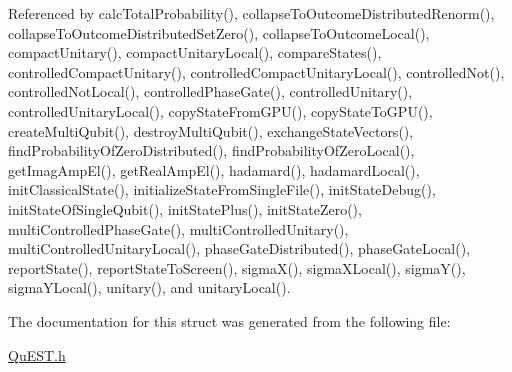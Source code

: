 Referenced by calc\+Total\+Probability(), collapse\+To\+Outcome\+Distributed\+Renorm(), collapse\+To\+Outcome\+Distributed\+Set\+Zero(), collapse\+To\+Outcome\+Local(), compact\+Unitary(), compact\+Unitary\+Local(), compare\+States(), controlled\+Compact\+Unitary(), controlled\+Compact\+Unitary\+Local(), controlled\+Not(), controlled\+Not\+Local(), controlled\+Phase\+Gate(), controlled\+Unitary(), controlled\+Unitary\+Local(), copy\+State\+From\+G\+P\+U(), copy\+State\+To\+G\+P\+U(), create\+Multi\+Qubit(), destroy\+Multi\+Qubit(), exchange\+State\+Vectors(), find\+Probability\+Of\+Zero\+Distributed(), find\+Probability\+Of\+Zero\+Local(), get\+Imag\+Amp\+El(), get\+Real\+Amp\+El(), hadamard(), hadamard\+Local(), init\+Classical\+State(), initialize\+State\+From\+Single\+File(), init\+State\+Debug(), init\+State\+Of\+Single\+Qubit(), init\+State\+Plus(), init\+State\+Zero(), multi\+Controlled\+Phase\+Gate(), multi\+Controlled\+Unitary(), multi\+Controlled\+Unitary\+Local(), phase\+Gate\+Distributed(), phase\+Gate\+Local(), report\+State(), report\+State\+To\+Screen(), sigma\+X(), sigma\+X\+Local(), sigma\+Y(), sigma\+Y\+Local(), unitary(), and unitary\+Local().



The documentation for this struct was generated from the following file\+:\begin{DoxyCompactItemize}
\item 
\mbox{\hyperlink{QuEST_8h}{Qu\+E\+S\+T.\+h}}\end{DoxyCompactItemize}
